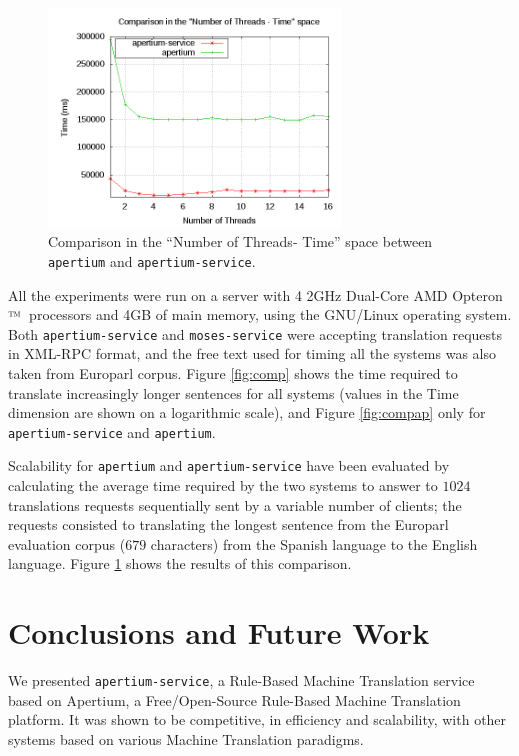\documentclass[11pt]{article}
\begin{document}
\begin{figure}[!ht]
\begin{center}
\includegraphics[width=7.75cm]{compmt}
\end{center}
\caption{Comparison in the ``Number of Threads- Time'' space between {\tt apertium} and {\tt apertium-service}.}
\label{fig:compmt}
\end{figure}

All the experiments were run on a server with 4 2GHz Dual-Core AMD Opteron${\mbox{\small\texttrademark}}$\ processors and 4GB of main memory, using the GNU/Linux operating system. Both {\tt apertium-service} and {\tt moses-service} were accepting translation requests in XML-RPC format, and the free text used for timing all the systems was also taken from Europarl corpus. Figure \ref{fig:comp} shows the time required to translate increasingly longer sentences for all systems (values in the Time dimension are shown on a logarithmic scale), and Figure \ref{fig:compap} only for {\tt apertium-service} and {\tt apertium}.

Scalability for {\tt apertium} and {\tt apertium-service} have been evaluated by calculating the average time required by the two systems to answer to $1024$ translations requests sequentially sent by a variable number of clients; the requests consisted to translating the longest sentence from the Europarl evaluation corpus ($679$ characters) from the Spanish language to the English language. Figure \ref{fig:compmt} shows the results of this comparison.


\section{Conclusions and Future Work}

We presented {\tt apertium-service}, a Rule-Based Machine Translation service based on Apertium, a Free/Open-Source Rule-Based Machine Translation platform. It was shown to be competitive, in efficiency and scalability, with other systems based on various Machine Translation paradigms. 
\end{document}
